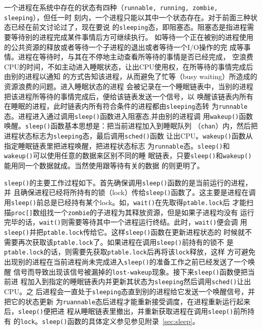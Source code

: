\documentclass{swfcthesismscctex}
\begin{document}
一个进程在系统中存在的状态有四种（\texttt{runnable, running, zombie, sleeping}），但任一时
刻内，一个进程只能以其中一个状态存在。对于前面三种状态已经在前文讨论过了，现在要说
的\texttt{sleeping}态，即阻塞态。阻塞态是指进程需要等待别的进程完成某件事情后方可继续执行。
如等待一个正在被别的进程使用的公共资源的释放或者等待一个子进程的退出或者等待一个I/O操作的完
成等事情\cite{stallings11os}。进程在等待时，与其在不停地主动查看所等待的事情是否已经完成，
空浪费CPU的时间，不如主动进入睡眠状态，让出CPU使用权，在所等待的事情完成后由别的进程以通知
的方式告知该进程，从而避免了忙等（busy waiting）所造成的资源浪费的问题。进入睡眠状态的进程
会被记录在一个睡眠链表中，当别的进程把该进程所等待的事情完成后，便给该链表发送一个信号，以
唤醒该链表内所有在睡眠的进程，此时链表内所有符合条件的进程都由\texttt{sleeping}态转
为\texttt{runnable}态。进程进入通过调用\texttt{sleep()}函数进入阻塞态,并由别的进程调
用\texttt{wakeup()}函数唤醒。\texttt{sleep()}函数基本思想是：把当前进程加入到睡眠队列
（\texttt{chan}）内，然后把进程状态标志为\texttt{sleeping}态，最后调用\texttt{sched()}函数
让出CPU。\texttt{wakeup()}函数从指定睡眠链表里把进程唤醒，把进程状态标志
为\texttt{runnable}态。\texttt{sleep()}和\texttt{wakeup()}可以使用任意的数据来区别不同的睡
眠链表，只要\texttt{sleep()}和\texttt{wakeup()}能用同一个数据就成。当然使用跟等待有关的数据
的则更明了。

\texttt{sleep()}的主要工作过程如下。首先确保调用\texttt{sleep()}函数的是当前运行的进程，并
且确保进程已经将所持有的锁（lock）传给\texttt{sleep()}函数了。这主要是进程在调
用\texttt{sleep()}前总是已经持有某个lock。如，\texttt{wait()}在先取得\texttt{ptable.lock}后
才能扫描\texttt{proc[]}数组找一个\texttt{zombie}的子进程为其释放资源，但是如果子进程均没有
运行完毕的话，\texttt{wait()}则需要等待其中一个进程运行终结。此时，\texttt{wait()}便会调
用\texttt{sleep()}并把\texttt{ptable.lock}传给它。这样\texttt{sleep()}函数在更新进程状态的
时候就不需要再次获取该\texttt{ptable.lock}了。如果进程在调用\texttt{sleep()}前持有的锁不
是\texttt{ptable.lock}的话，则需要先获取\texttt{ptable.lock}后再将该\texttt{lock}释放，这样
方可避免出现别的进程在当前进程尚未完成进入\texttt{sleep()}的准备工作之前已经发送了一个唤醒
信号而导致出现该信号被漏掉的\texttt{lost-wakeup}现象。接下来\texttt{sleep()}函数便把当前进
程加入到指定的睡眠链表内并更新其状态为\texttt{sleeping}然后调用\texttt{sched()}让出CPU。之
后进程会一直处于\texttt{sleeping}态直到别的进程给它发送一个唤醒信号，并把它的状态更新
为\texttt{ruannable}态后进程才能重新接受调度，在进程重新运行起来后，\texttt{sleep()}便把进
程从睡眠链表里撤出，并重新获取进程在调用\texttt{sleep()}前所持有
的\texttt{lock}。\texttt{sleep()}函数的具体定义参见参见附录~\ref{sec:sleep}。
\end{document}

